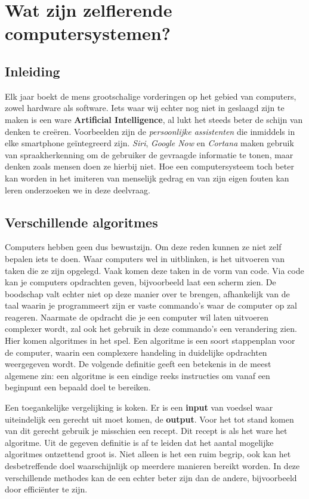 
\section{Wat zijn zelflerende computersystemen?}

\subsection{Inleiding}
Elk jaar boekt de mens grootschalige vorderingen op het gebied van computers, zowel hardware als software. Iets waar wij echter nog niet in geslaagd zijn te maken is een ware \textbf{ Artificial Intelligence}, al lukt het steeds beter de schijn van denken te creëren. Voorbeelden zijn de \textit{persoonlijke assistenten} die inmiddels in elke smartphone geïntegreerd zijn. \textit{Siri}, \textit{Google Now} en \textit{Cortana} maken gebruik van spraakherkenning om de gebruiker de gevraagde informatie te tonen, maar denken zoals mensen doen ze hierbij niet. Hoe een computersysteem toch beter kan worden in het imiteren van menselijk gedrag en van zijn eigen fouten kan leren onderzoeken we in deze deelvraag.


\subsection{Verschillende algoritmes}
Computers hebben geen dus bewustzijn. Om deze reden kunnen ze niet zelf bepalen iets te doen. Waar computers wel in uitblinken, is het uitvoeren van taken die ze zijn opgelegd. Vaak komen deze taken in de vorm van code. Via code kan je computers opdrachten geven, bijvoorbeeld laat een scherm zien. De boodschap valt echter niet op deze manier over te brengen, afhankelijk van de taal waarin je programmeert zijn er vaste commando's waar de computer op zal reageren.
Naarmate de opdracht die je een computer wil laten uitvoeren complexer wordt, zal ook het gebruik in deze commando's een verandering zien. Hier komen algoritmes in het spel. Een algoritme is een soort stappenplan voor de computer, waarin een complexere handeling in duidelijke opdrachten weergegeven wordt. De volgende definitie geeft een betekenis in de meest algemene zin: een algoritme is een eindige reeks instructies om vanaf een beginpunt een bepaald doel te bereiken.\cite{WoordenOrg}

Een toegankelijke vergelijking is koken. Er is een \textbf{input} van voedsel waar uiteindelijk een gerecht uit moet komen, de \textbf{output}. Voor het tot stand komen van dit gerecht gebruik je misschien een recept. Dit recept is als het ware het algoritme.
Uit de gegeven definitie is af te leiden dat het aantal mogelijke algoritmes ontzettend groot is. Niet alleen is het een ruim begrip, ook kan het desbetreffende doel waarschijnlijk op meerdere manieren bereikt worden. In deze verschillende methodes kan de een echter beter zijn dan de andere, bijvoorbeeld door effici\"enter te zijn.

